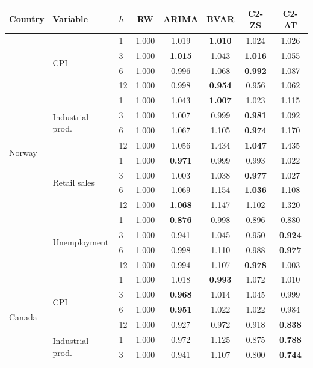 \small
\begin{tabular}{lllccccc}
\toprule
Country & Variable & $h$ & RW & ARIMA & BVAR & C2-ZS & C2-AT \\
\midrule
\multirow{16}{*}{Norway} & \multirow{4}{*}{CPI} & 1 & 1.000 & 1.019 & \textbf{1.010} & 1.024 & 1.026 \\
 &  & 3 & 1.000 & \textbf{1.015} & 1.043 & \textbf{1.016} & 1.055 \\
 &  & 6 & 1.000 & 0.996 & 1.068 & \textbf{0.992} & 1.087 \\
 &  & 12 & 1.000 & 0.998 & \textbf{0.954} & 0.956 & 1.062 \\
 & \multirow{4}{*}{Industrial prod.} & 1 & 1.000 & 1.043 & \textbf{1.007} & 1.023 & 1.115 \\
 &  & 3 & 1.000 & 1.007 & 0.999 & \textbf{0.981} & 1.092 \\
 &  & 6 & 1.000 & 1.067 & 1.105 & \textbf{0.974} & 1.170 \\
 &  & 12 & 1.000 & 1.056 & 1.434 & \textbf{1.047} & 1.435 \\
 & \multirow{4}{*}{Retail sales} & 1 & 1.000 & \textbf{0.971} & 0.999 & 0.993 & 1.022 \\
 &  & 3 & 1.000 & 1.003 & 1.038 & \textbf{0.977} & 1.027 \\
 &  & 6 & 1.000 & 1.069 & 1.154 & \textbf{1.036} & 1.108 \\
 &  & 12 & 1.000 & \textbf{1.068} & 1.147 & 1.102 & 1.320 \\
 & \multirow{4}{*}{Unemployment} & 1 & 1.000 & \textbf{0.876} & 0.998 & 0.896 & 0.880 \\
 &  & 3 & 1.000 & 0.941 & 1.045 & 0.950 & \textbf{0.924} \\
 &  & 6 & 1.000 & 0.998 & 1.110 & 0.988 & \textbf{0.977} \\
 &  & 12 & 1.000 & 0.994 & 1.107 & \textbf{0.978} & 1.003 \\
\midrule
\multirow{16}{*}{Canada} & \multirow{4}{*}{CPI} & 1 & 1.000 & 1.018 & \textbf{0.993} & 1.072 & 1.010 \\
 &  & 3 & 1.000 & \textbf{0.968} & 1.014 & 1.045 & 0.999 \\
 &  & 6 & 1.000 & \textbf{0.951} & 1.022 & 1.022 & 0.984 \\
 &  & 12 & 1.000 & 0.927 & 0.972 & 0.918 & \textbf{0.838} \\
 & \multirow{4}{*}{Industrial prod.} & 1 & 1.000 & 0.972 & 1.125 & 0.875 & \textbf{0.788} \\
 &  & 3 & 1.000 & 0.941 & 1.107 & 0.800 & \textbf{0.744} \\

\end{tabular}
